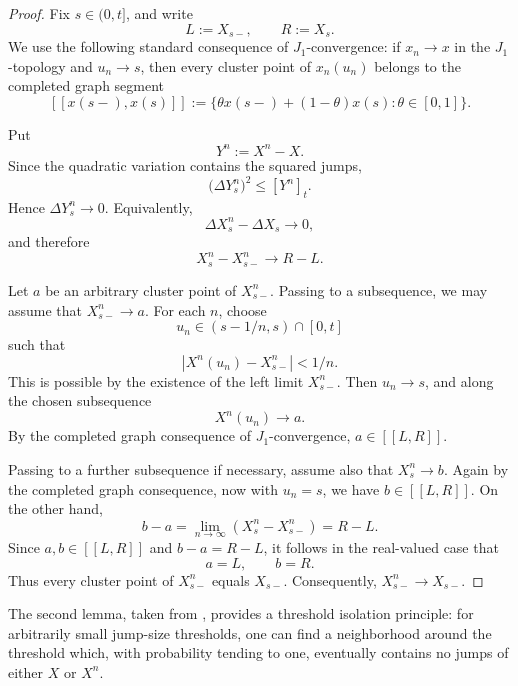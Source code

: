\documentclass[a4paper,10pt]{article}
\begin{document}
\begin{proof}
Fix \(s\in(0,t]\), and write
\[
        L:=X_{s-},\qquad R:=X_s .
\]
We use the following standard consequence of \(J_1\)-convergence: if
\(x_n\to x\) in the \(J_1\)-topology and \(u_n\to s\), then every cluster
point of \(x_n(u_n)\) belongs to the completed graph segment
\[
        [[x(s-),x(s)]]
        :=
        \{\theta x(s-)+(1-\theta)x(s):\theta\in[0,1]\}.
\]

Put
\[
        Y^n:=X^n-X .
\]
Since the quadratic variation contains the squared jumps,
\[
        \bigl(\Delta Y^n_s\bigr)^2\le [Y^n]_t .
\]
Hence
$
        \Delta Y^n_s\to0 .
$
Equivalently,
\[
        \Delta X^n_s-\Delta X_s\to0,
\]
and therefore
\[
        X^n_s-X^n_{s-}\to R-L .
\]

Let \(a\) be an arbitrary cluster point of \(X^n_{s-}\). Passing to a
subsequence, we may assume that
$
        X^n_{s-}\to a .
$
For each \(n\), choose
\[
        u_n\in (s-1/n,s)\cap[0,t]
\]
such that
\[
        |X^n(u_n)-X^n_{s-}|<1/n .
\]
This is possible by the existence of the left limit \(X^n_{s-}\).
Then \(u_n\to s\), and along the chosen subsequence
\[
        X^n(u_n)\to a .
\]
By the completed graph consequence of \(J_1\)-convergence,
$
        a\in [[L,R]] .
$

Passing to a further subsequence if necessary, assume also that
$
        X^n_s\to b .
$
Again by the completed graph consequence, now with \(u_n=s\), we have
$
        b\in [[L,R]] .
$
On the other hand,
\[
        b-a
        =
        \lim_{n\to\infty} (X^n_s-X^n_{s-})
        =
        R-L .
\]
Since \(a,b\in [[L,R]]\) and \(b-a=R-L\), it follows in the real-valued
case that
\[
        a=L,\qquad b=R .
\]
Thus every cluster point of \(X^n_{s-}\) equals \(X_{s-}\). Consequently,
$
        X^n_{s-}\to X_{s-}.
$
\end{proof}
The second lemma, taken from \cite{CompJump}, provides a threshold
isolation principle: for arbitrarily small jump-size thresholds, one can
find a neighborhood around the threshold which, with probability tending
to one, eventually contains no jumps of either \(X\) or \(X^n\).
\end{document}
